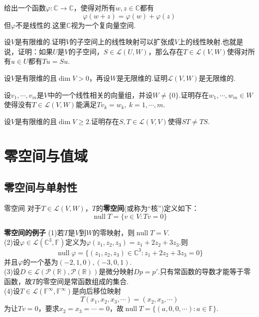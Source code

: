 \documentclass[lang=cn, zihao=5]{elegantbook}
\newcommand{\R}{\mathbb{R}}
\newcommand{\C}{\mathbb{C}}
\newcommand{\F}{\mathbb{F}}
\newcommand{\lmap}{\mathcal{L}}
\DeclareMathOperator{\nul}{null}
\newcommand{\examplefont}[1]{\color{mgreen} \textbf{#1}}
\begin{document}
\begin{exercise}
	给出一个函数$\varphi :\C \to \C$，使得对所有$w,z \in \C$都有$$\varphi (w+z) = \varphi (w) + \varphi (z)$$
	但$\varphi$不是线性的.这里$\C$视为一个复向量空间.
\end{exercise}

\begin{exercise}
	设$V$是有限维的.证明$V$的子空间上的线性映射可以扩张成$V$上的线性映射.也就是说，证明：如果$U$是$V$的子空间，$S \in \lmap (U,W)$，那么存在$T \in \lmap (V,W)$使得对所有$u \in U$都有$Tu=Su$.
\end{exercise}

\begin{exercise}
	设$V$是有限维的且$\dim V>0$，再设$W$是无限维的.证明$\lmap (V,W)$是无限维的.
\end{exercise}

\begin{exercise}
	设$v_1, \cdots ,v_m$是$V$中的一个线性相关的向量组，并设$W \neq \{ 0 \}$.证明存在$w_1, \cdots ,w_m \in W$使得没有$T \in \lmap (V,W)$能满足$Tv_k=w_k,~k=1,\cdots ,m$.
\end{exercise}

\begin{exercise}
	设$V$是有限维的且$\dim V \geq 2$.证明存在$S,T \in \lmap (V,V)$使得$ST \neq TS$.
\end{exercise}

\section{零空间与值域}

\subsection{零空间与单射性}

\begin{definition}{零空间}
	对于$T \in \lmap (V,W)$，$T$的\textbf{零空间}(或称为“核”)定义如下：$$\nul T = \{ v \in V:Tv=0 \}$$
\end{definition}

\begin{example}{\examplefont{零空间的例子}}
	(1)若$T$是$V$到$W$的零映射，则$\nul T=V$. \\
	(2)设$\varphi \in \lmap (\C ^3,\F)$定义为$\varphi (z_1,z_2,z_3)=z_1+2z_2+3z_3$.则$$\nul \varphi = \{ (z_1,z_2,z_3) \in \C ^3 : z_1+2z_2+3z_3=0 \}$$
	并且$\null \varphi$的一个基为$(-2,1,0),(-3,0,1)$. \\
	(3)设$D \in \lmap (\mathcal{P}(\R),\mathcal{P}(\R))$是微分映射$Dp=p'$.只有常函数的导数才能等于零函数，故$T$的零空间是常函数组成的集合. \\
	(4)设$T \in \lmap (\F ^{\infty},\F ^{\infty})$是向后移位映射$$T(x_1,x_2,x_3, \cdots )=(x_2,x_3,\cdots )$$
	为让$Tv=0$，要求$x_2=x_3=\cdots =0$，故$\nul T = \{ (a,0,0,\cdots ) :a \in \F \}$.
\end{example}
\end{document}

